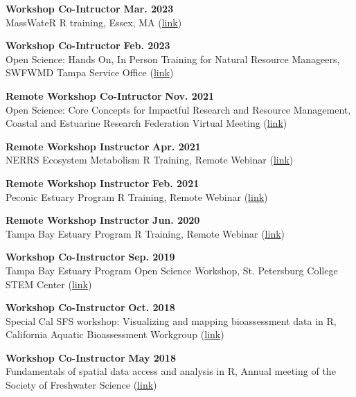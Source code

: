 \documentclass[letterpaper,12pt]{article}
\begin{document}
{\bf Workshop Co-Intructor} \hfill {\bf Mar. 2023}\\
MassWateR R training, Essex, MA ({\footnotesize\href{https://massbays-tech.github.io/intro-to-r/}{link}})

{\bf Workshop Co-Intructor} \hfill {\bf Feb. 2023}\\
Open Science: Hands On, In Person Training for Natural Resource Manageers, SWFWMD Tampa Service Office ({\footnotesize\href{https://tbep-tech.github.io/tbep-os-workshop/}{link}})

{\bf Remote Workshop Co-Intructor} \hfill {\bf Nov. 2021}\\
Open Science: Core Concepts for Impactful Research and Resource Management, Coastal and Estuarine Research Federation Virtual Meeting ({\footnotesize\href{https://tbep-tech.github.io/cerf-os-workshop/}{link}})

{\bf Remote Workshop Instructor} \hfill {\bf Apr. 2021}\\
NERRS Ecosystem Metabolism R Training, Remote Webinar ({\footnotesize\href{https://tbep-tech.github.io/ecometab-r-training/}{link}})

{\bf Remote Workshop Instructor} \hfill {\bf Feb. 2021}\\
Peconic Estuary Program R Training, Remote Webinar ({\footnotesize\href{https://tbep-tech.github.io/pep-r-training/}{link}})

{\bf Remote Workshop Instructor} \hfill {\bf Jun. 2020}\\
Tampa Bay Estuary Program R Training, Remote Webinar ({\footnotesize\href{https://tbep-tech.github.io/tbep-r-training/}{link}})

{\bf Workshop Co-Instructor} \hfill {\bf Sep. 2019}\\
Tampa Bay Estuary Program Open Science Workshop, St. Petersburg College STEM Center ({\footnotesize\href{https://tbep-tech.github.io/}{link}})

{\bf Workshop Co-Instructor} \hfill {\bf Oct. 2018}\\
Special Cal SFS workshop: Visualizing and mapping bioassessment data in R, California Aquatic Bioassessment Workgroup ({\footnotesize\href{https://sccwrp.github.io/CABW2018_R_training}{link}})

{\bf Workshop Co-Instructor} \hfill {\bf May 2018}\\
Fundamentals of spatial data access and analysis in R, Annual meeting of the Society of Freshwater Science ({\footnotesize\href{https://ryan-hill.github.io/sfs-r-gis-2018/}{link}})
\end{document}
